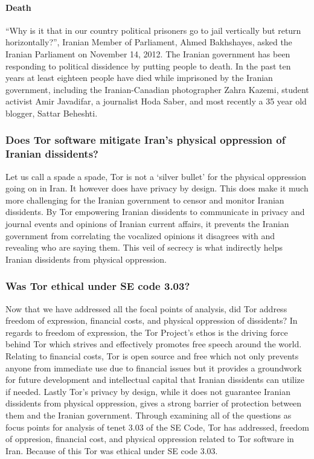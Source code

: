 \documentclass[11pt]{article}
\begin{document}
\begin{multicols}{2}
\paragraph{Death}

``Why is it that in our country political prisoners go to jail vertically but return
horizontally?'', Iranian Member of Parliament, Ahmed Bakhshayes, asked the Iranian Parliament on
November 14, 2012.\cite{IranBloggersDeath} The Iranian government has been
responding to political dissidence by putting people to death. In the past ten
years at least eighteen people have died while imprisoned by the Iranian
government, including the Iranian-Canadian photographer Zahra Kazemi, student
activist Amir Javadifar, a journalist Hoda Saber, and most recently a 35 year
old blogger, Sattar Beheshti. \cite{IranBloggersDeath}


\subsubsection{Does Tor software mitigate Iran's physical oppression of
Iranian dissidents?}

Let us call a spade a spade, Tor is not a `silver bullet' for the physical
oppression going on in Iran. It however does have privacy by design. This does
make it much more challenging for the Iranian government to censor and monitor
Iranian dissidents. By Tor empowering Iranian dissidents to communicate in
privacy and journal events and opinions of Iranian current affairs, it prevents
the Iranian government from correlating the vocalized opinions it disagrees with
and revealing who are saying them. This veil of secrecy is what indirectly helps
Iranian dissidents from physical oppression.

\subsubsection{Was Tor ethical under SE code 3.03?}

Now that we have addressed all the focal points of analysis, did Tor address
freedom of expression, financial costs, and physical oppression of dissidents?
In regards to freedom of expression, the Tor Project's ethos is the driving force
behind Tor which strives and effectively promotes free speech around the world.
Relating to financial costs, Tor is open source and free which not only prevents
anyone from immediate use due to financial issues but it provides a groundwork
for future development and intellectual capital that Iranian dissidents can
utilize if needed. Lastly Tor's privacy by design, while it does not guarantee
Iranian dissidents from physical oppression, gives a strong barrier of protection
between them and the Iranian government. Through examining all of the questions
as focus points for analysis of tenet 3.03 of the SE Code, Tor has addressed,
freedom of oppresion, financial cost, and physical oppression related to Tor
software in Iran. Because of this Tor was ethical under SE code 3.03.


\end{multicols}
\end{document}
